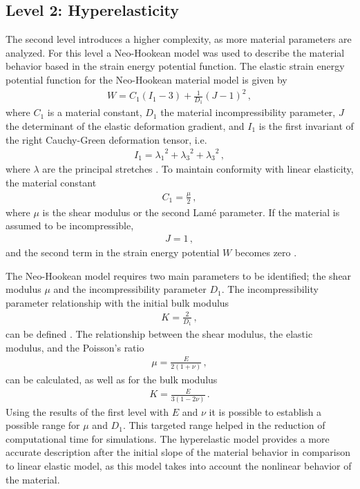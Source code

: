 \subsection{Level 2: Hyperelasticity}
The second level introduces a higher complexity, as more material parameters are analyzed. For this level a 
Neo-Hookean model was used to describe the material behavior based in the strain energy potential function.
The elastic strain energy potential function for the Neo-Hookean material model is given by
\begin{align}
    W = C_1 (I_1 - 3) + \frac{1}{D_1} (J-1)^2 \, ,
\end{align}
where $C_1$ is a material constant, $D_1$ the material incompressibility parameter, $J$ the determinant 
of the elastic deformation gradient, and $I_1$ is the first invariant of the right Cauchy-Green deformation tensor, i.e. 
\begin{align}
    I_1 = {\lambda_1}^2 + {\lambda_3}^2 + {\lambda_3}^2 \, ,
\end{align} 
where $\lambda$ are the principal stretches \cite{Ogden2013}. To maintain conformity with linear elasticity, the material constant 
\begin{align}
    C_1 = \frac{\mu}{2} \, ,
\end{align}
where $\mu$ is the shear modulus or the second Lamé parameter. If the material is assumed to be incompressible,
\begin{align}
    J = 1 \, ,
\end{align} 
and the second term in the strain energy potential $W$ becomes zero \cite{Pence2015}. 

The Neo-Hookean model requires two main parameters to be identified; the shear modulus $\mu$ and 
the incompressibility parameter $D_1$. The incompressibility parameter relationship with the initial bulk modulus
\begin{align}
    K = \frac{2}{D_1} \, ,
    \label{eq:incomparcp1}
\end{align}
 can be defined \cite{Ansys2010}. The relationship between the shear modulus, the elastic modulus, and the Poisson's ratio
\begin{align}
    \mu = \frac{E}{2(1+\nu)} \, ,
    \label{eq:mucp1}
\end{align}
can be calculated, as well as for the bulk modulus 
\begin{align}
    K = \frac{E}{3(1-2\nu)} \, .
    \label{eq:bulkmodcp1}
\end{align}
Using the results of the first level with $E$ and $\nu$ it is possible to establish a possible range for $\mu$ 
and $D_1$. This targeted range helped in the reduction of computational time for simulations.
The hyperelastic model provides a more accurate description after the initial slope of the material behavior in comparison to linear 
elastic model, as this model takes into account the nonlinear behavior of the material. 

